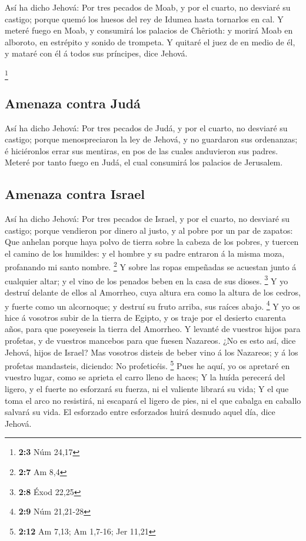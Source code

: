  Así ha dicho Jehová: Por tres pecados de Moab, y por el
cuarto, no desviaré su castigo; porque quemó los huesos del rey de
Idumea hasta tornarlos en cal.  Y meteré fuego en Moab, y
consumirá los palacios de Chêrioth: y morirá Moab en alboroto, en
estrépito y sonido de trompeta.  Y quitaré el juez de en
medio de él, y mataré con él á todos sus príncipes, dice Jehová.

\footnote{\textbf{2:3} Núm 24,17}

\hypertarget{amenaza-contra-juduxe1}{%
\subsection{Amenaza contra Judá}\label{amenaza-contra-juduxe1}}

 Así ha dicho Jehová: Por tres pecados de Judá, y por el
cuarto, no desviaré su castigo; porque menospreciaron la ley de Jehová,
y no guardaron sus ordenanzas; é hiciéronlos errar sus mentiras, en pos
de las cuales anduvieron sus padres.  Meteré por tanto
fuego en Judá, el cual consumirá los palacios de Jerusalem.

\hypertarget{amenaza-contra-israel}{%
\subsection{Amenaza contra Israel}\label{amenaza-contra-israel}}

 Así ha dicho Jehová: Por tres pecados de Israel, y por el
cuarto, no desviaré su castigo; porque vendieron por dinero al justo, y
al pobre por un par de zapatos:  Que anhelan porque haya
polvo de tierra sobre la cabeza de los pobres, y tuercen el camino de
los humildes: y el hombre y su padre entraron á la misma moza,
profanando mi santo nombre. \footnote{\textbf{2:7} Am 8,4}
 Y sobre las ropas empeñadas se acuestan junto á cualquier
altar; y el vino de los penados beben en la casa de sus dioses.
\footnote{\textbf{2:8} Éxod 22,25}  Y yo destruí delante
de ellos al Amorrheo, cuya altura era como la altura de los cedros, y
fuerte como un alcornoque; y destruí su fruto arriba, sus raíces abajo.
\footnote{\textbf{2:9} Núm 21,21-28}  Y yo os hice á
vosotros subir de la tierra de Egipto, y os traje por el desierto
cuarenta años, para que poseyeseis la tierra del Amorrheo.
 Y levanté de vuestros hijos para profetas, y de vuestros
mancebos para que fuesen Nazareos. ¿No es esto así, dice Jehová, hijos
de Israel?  Mas vosotros disteis de beber vino á los
Nazareos; y á los profetas mandasteis, diciendo: No profeticéis.
\footnote{\textbf{2:12} Am 7,13; Am 1,7-16; Jer 11,21} 
Pues he aquí, yo os apretaré en vuestro lugar, como se aprieta el carro
lleno de haces;  Y la huída perecerá del ligero, y el
fuerte no esforzará su fuerza, ni el valiente librará su vida;
 Y el que toma el arco no resistirá, ni escapará el
ligero de pies, ni el que cabalga en caballo salvará su vida.
 El esforzado entre esforzados huirá desnudo aquel día,
dice Jehová.

